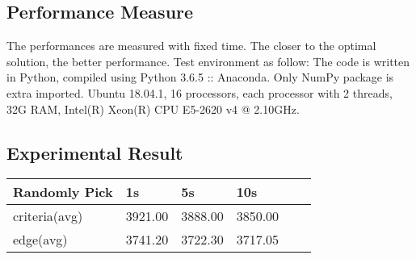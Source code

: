 \documentclass[conference,compsoc]{IEEEtran}
\begin{document}
\subsection{Performance Measure}
\par The performances are measured with fixed time. The closer to the optimal solution, the better performance. Test environment as follow:
The code is written in Python, compiled using Python 3.6.5 :: Anaconda. Only NumPy package is extra imported. Ubuntu 18.04.1,   
16 processors, each processor with 2 threads, 32G RAM,  Intel(R) Xeon(R) CPU E5-2620 v4 @ 2.10GHz.
\subsection{Experimental Result}
\begin{minipage}{\linewidth}
	\centering	
	 \label{tab:title} 	
	\begin{tabular}{ C{1in} C{0.4in} *4{C{0.4in}}}\toprule[0.4pt]
		\bf Randomly Pick & \bf 1s  & \bf 5s & \bf 10s \\\midrule
		criteria(avg)    & 3921.00     & 3888.00     &  3850.00 \\
		edge(avg)        & 3741.20     & 3722.30     &  3717.05 \\
		\bottomrule[1.25pt]
		\end {tabular}\par
		\bigskip
		\centering{}
		
\end{minipage}
\end{document}
